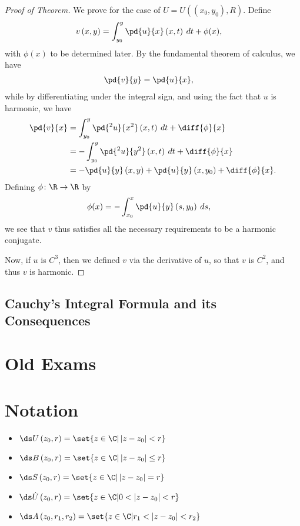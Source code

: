 \documentclass[10pt]{mypackage}
\begin{document}
\begin{proof}[Proof of Theorem]
  We prove for the case of $U = U\left( \left( x_0,y_0 \right),R \right)$. Define
  \begin{align*}
    v\left( x,y \right) &= \int_{y_0}^{y} \pd{u}{x}\left( x,t \right)\:dt + \phi(x),
  \end{align*}
  with $\phi(x)$ to be determined later. By the fundamental theorem of calculus, we have
  \begin{align*}
    \pd{v}{y} &= \pd{u}{x},
  \end{align*}
  while by differentiating under the integral sign, and using the fact that $u$ is harmonic, we have
  \begin{align*}
    \pd{v}{x} &= \int_{y_0}^{y} \pd{^2u}{x^2}\left( x,t \right)\:dt + \diff{\phi}{x}\\
              &= - \int_{y_0}^{y} \pd{^2u}{y^2}\left( x,t \right)\:dt + \diff{\phi}{x}\\
              &= - \pd{u}{y}\left( x,y \right) + \pd{u}{y}\left( x,y_0 \right) + \diff{\phi}{x}.
  \end{align*}
  Defining $\phi\colon \R\rightarrow \R$ by
  \begin{align*}
    \phi(x) &= -\int_{x_0}^{x} \pd{u}{y}\left( s,y_0 \right)\:ds,
  \end{align*}
  we see that $v$ thus satisfies all the necessary requirements to be a harmonic conjugate.\newline

  Now, if $u$ is $C^{3}$, then we defined $v$ via the derivative of $u$, so that $v$ is $C^{2}$, and thus $v$ is harmonic.
\end{proof}
\subsection{Cauchy's Integral Formula and its Consequences}%

\section{Old Exams}%
\section{Notation}%
\begin{itemize}
  \item $\ds U\left( z_0,r \right) = \set{z\in \C | \left\vert z-z_0 \right\vert < r}$
  \item $\ds B\left( z_0,r \right) = \set{z\in \C | \left\vert z-z_0 \right\vert \leq r}$
  \item $\ds S\left( z_0,r \right) = \set{z\in \C | \left\vert z-z_0 \right\vert = r}$
  \item $\ds \dot{U}\left( z_0,r \right) = \set{z\in \C | 0 < \left\vert z-z_0 \right\vert < r}$
  \item $\ds A\left( z_0,r_1,r_2 \right) = \set{z\in \C | r_1 < \left\vert z-z_0 \right\vert < r_2}$
\end{itemize}
\end{document}
